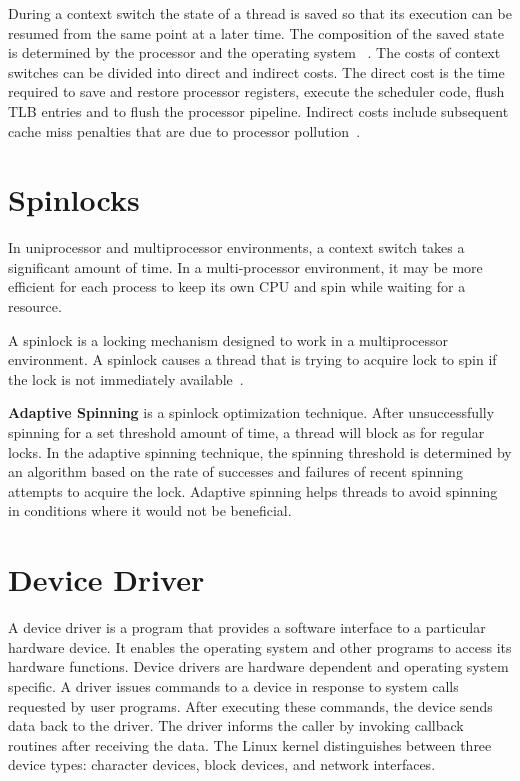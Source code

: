During a context switch the state of a thread is saved so that its
execution can be resumed from the same point at a later time. The
composition of the saved state is determined by the processor and the operating system
~\cite{Galvin}. The costs of context switches can be divided into direct and
indirect costs. The direct cost is the time required to save and restore
processor registers, execute the scheduler code, flush TLB entries and
to flush the processor pipeline. Indirect costs include subsequent cache miss 
penalties that are due to processor 
pollution~\cite{Soares+:osdi10, Li:2007:QCC:1281700.1281702}.

\section{Spinlocks}
In uniprocessor and multiprocessor environments, a context switch takes a
significant amount of time.  In a multi-processor environment, it may be more
efficient for each process to keep its own CPU and spin while waiting
for a resource.

A spinlock is a locking mechanism designed to work in a multiprocessor
environment. A spinlock causes a thread that is trying to acquire lock
to spin if the lock is not immediately available~\cite{Bovet:2005:ULK:1077084}.

\textbf{Adaptive Spinning} is a spinlock optimization technique. 
After unsuccessfully spinning for a set threshold amount of time, a thread
will block as for regular locks.
In the adaptive spinning technique, the spinning threshold is determined by
an algorithm based on the rate of successes and failures of recent spinning
attempts to acquire the lock.  Adaptive spinning helps threads to avoid
spinning in conditions where it would not be beneficial.

\section{Device Driver}
\label{sec:device driver}

A device driver is a program that provides a software interface to a
particular hardware device. It enables the operating system and other
programs to access its hardware functions. Device drivers are hardware
dependent and operating system specific.  A driver issues commands to 
a device in response to system calls requested by user programs.
After executing these commands,
the device sends data back to the driver. The driver informs the caller by 
invoking callback routines after receiving the data. The Linux
kernel distinguishes between three device types: character devices,
block devices, and network interfaces.

